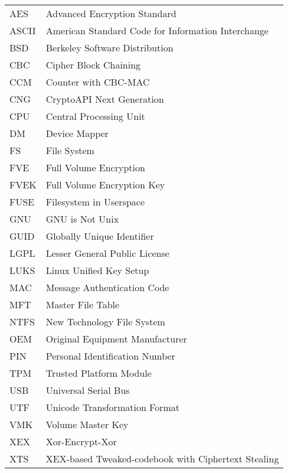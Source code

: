 
\seznamzkr

\begin{tabular}{ll}
  AES & Advanced Encryption Standard \\
  ASCII & American Standard Code for Information Interchange \\
  BSD & Berkeley Software Distribution \\
  CBC & Cipher Block Chaining \\
  CCM & Counter with CBC-MAC \\
  CNG & CryptoAPI Next Generation \\
  CPU & Central Processing Unit \\
  DM & Device Mapper \\
  FS &  File System \\
  FVE & Full Volume Encryption \\
  FVEK & Full Volume Encryption Key \\
  FUSE & Filesystem in Userspace \\
  GNU & GNU is Not Unix \\
  GUID & Globally Unique Identifier \\
  LGPL & Lesser General Public License \\
  LUKS & Linux Unified Key Setup \\
  MAC & Message Authentication Code \\
  MFT & Master File Table \\
  NTFS & New Technology File System \\
  OEM & Original Equipment Manufacturer \\
  PIN & Personal Identification Number \\
  TPM & Trusted Platform Module \\
  USB & Universal Serial Bus \\
  UTF & Unicode Transformation Format \\
  VMK & Volume Master Key \\
  XEX & Xor-Encrypt-Xor \\
  XTS & XEX-based Tweaked-codebook with Ciphertext Stealing \\
\end{tabular}

